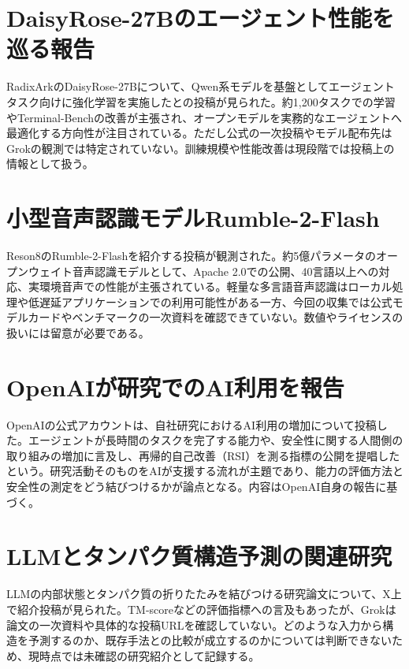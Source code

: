 \section{DaisyRose-27Bのエージェント性能を巡る報告}
RadixArkのDaisyRose-27Bについて、Qwen系モデルを基盤としてエージェントタスク向けに強化学習を実施したとの投稿が見られた。約1,200タスクでの学習やTerminal-Benchの改善が主張され、オープンモデルを実務的なエージェントへ最適化する方向性が注目されている。ただし公式の一次投稿やモデル配布先はGrokの観測では特定されていない。訓練規模や性能改善は現段階では投稿上の情報として扱う。

\section{小型音声認識モデルRumble-2-Flash}
Reson8のRumble-2-Flashを紹介する投稿が観測された。約5億パラメータのオープンウェイト音声認識モデルとして、Apache 2.0での公開、40言語以上への対応、実環境音声での性能が主張されている。軽量な多言語音声認識はローカル処理や低遅延アプリケーションでの利用可能性がある一方、今回の収集では公式モデルカードやベンチマークの一次資料を確認できていない。数値やライセンスの扱いには留意が必要である。

\section{OpenAIが研究でのAI利用を報告}
OpenAIの公式アカウントは、自社研究におけるAI利用の増加について投稿した。エージェントが長時間のタスクを完了する能力や、安全性に関する人間側の取り組みの増加に言及し、再帰的自己改善（RSI）を測る指標の公開を提唱したという。研究活動そのものをAIが支援する流れが主題であり、能力の評価方法と安全性の測定をどう結びつけるかが論点となる。内容はOpenAI自身の報告に基づく。

\section{LLMとタンパク質構造予測の関連研究}
LLMの内部状態とタンパク質の折りたたみを結びつける研究論文について、X上で紹介投稿が見られた。TM-scoreなどの評価指標への言及もあったが、Grokは論文の一次資料や具体的な投稿URLを確認していない。どのような入力から構造を予測するのか、既存手法との比較が成立するのかについては判断できないため、現時点では未確認の研究紹介として記録する。